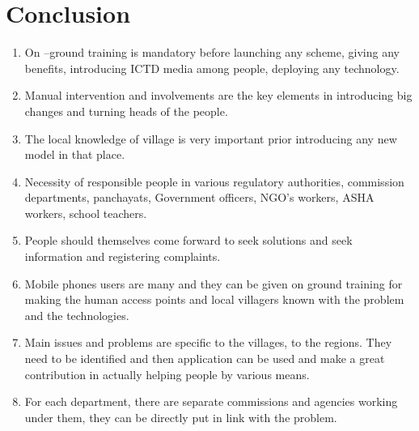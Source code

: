\chapter{Conclusion}

\begin{enumerate}
\item On –ground training is mandatory before launching any scheme, giving any
benefits, introducing ICTD media among people, deploying any technology.
\item Manual intervention and involvements are the key elements in introducing
big changes and turning heads of the people.
\item The local knowledge of village is very important prior introducing any new
model in that place.
\item Necessity of responsible people in various regulatory authorities, commission
departments, panchayats, Government officers, NGO’s workers, ASHA
workers, school teachers.
\item People should themselves come forward to seek solutions and seek
information and registering complaints.
\item Mobile phones users are many and they can be given on ground training for
making the human access points and local villagers known with the problem
and the technologies.
\item Main issues and problems are specific to the villages, to the regions. They
need to be identified and then application can be used and make a great
contribution in actually helping people by various means.
\item For each department, there are separate commissions and agencies working
under them, they can be directly put in link with the problem.

\end{enumerate}